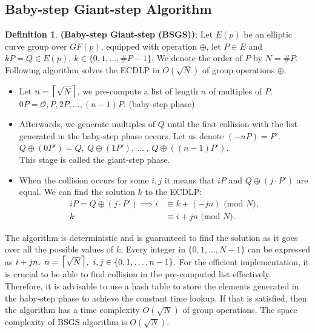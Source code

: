 \documentclass[thesis=M,english]{FITthesis}[2012/10/20]
\theoremstyle{remark}
\theoremstyle{definition}
\newtheorem{DF}{Definition}[section]
\begin{document}
\subsection{Baby-step Giant-step Algorithm}
\begin{DF}
\textbf{(Baby-step Giant-step (BSGS))}: Let $E(p)$ be an elliptic curve group over $GF(p)$, equipped with operation $\oplus$, let $P \in E$ and $kP = Q \in E(p),\ k \in \{0, 1, \ldots, \#P - 1\}$. We denote the order of $P$ by $N = \#P$. Following algorithm solves the ECDLP in $O(\sqrt{N})$ of group operations $\oplus$.
\begin{itemize}
\item Let $n = \mathlarger{\mathlarger{\mathlarger{\lceil}}} \sqrt{N} \mathlarger{\mathlarger{\mathlarger{\rceil}}}$, we pre-compute a list of length $n$ of multiples of $P$. \\
$0P = \mathcal{O}, P, 2P, \ldots, (n-1)P.$ \hfill (baby-step phase) \\
\item Afterwards, we generate multiples of $Q$ until the first collision with the list generated in the baby-step phase occurs. Let us denote $(-n P) = P'$. \\
$Q \oplus (0P') = Q,\ Q \oplus (1P'),\ \ldots\ ,\ Q \oplus ((n-1)P').$\\
This stage is called the giant-step phase.
\item When the collision occurs for some $i,j$ it means that $iP$ and $Q \oplus (j\cdot P')$ are equal. We can find the solution $k$ to the ECDLP:
\begin{align*}
iP = Q \oplus (j\cdot P') \implies i &\equiv k + (-jn) \text{ (mod $N$)}, \\
k &\equiv i + jn \text{ (mod $N$)}.
\end{align*}
\end{itemize}
\noindent The algorithm is deterministic and is guaranteed to find the solution as it goes over all the possible values of $k$. Every integer in $\{0, 1, \ldots, N - 1\}$ can be expressed as $i + jn,\ n = \mathlarger{\mathlarger{\mathlarger{\lceil}}} \sqrt{N} \mathlarger{\mathlarger{\mathlarger{\rceil}}},\ i,j \in \{0,1,\ldots, n-1\}.$ 
For the efficient implementation, it is crucial to be able to find collision in the pre-computed list effectively. Therefore, it is advisable to use a hash table to store the elements generated in the baby-step phase to achieve the constant time lookup. If that is satisfied, then the algorithm has a time complexity $O(\sqrt{N})$ of group operations. The space complexity of BSGS algorithm is $O(\sqrt{N})$.
\end{DF}
\end{document}

